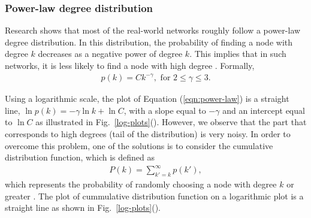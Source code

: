 \documentclass[10pt,a4paper]{article}
\theoremstyle{plain}
\theoremstyle{definition}
\begin{document}
\subsubsection{Power-law degree distribution}
Research shows that most of the real-world networks roughly follow a power-law degree distribution. In this distribution, the probability of finding a node with degree $k$ decreases as a negative power of degree $k$. This implies that in such networks, it is less likely to find a node with high degree \citep{estrada2011structure}.
Formally,
\begin{eqnarray}
p(k) = C k^{-\gamma}, \text{ for } 2 \leq  \gamma \leq  3.
\label{eqn:power-law}
\end{eqnarray}

Using a logarithmic scale, the plot of Equation (\ref{eqn:power-law}) is a straight line, $\ln p(k) = -\gamma \ln k + \ln C $, with a slope equal to $-\gamma $ and an intercept equal to $\ln C$ as illustrated in Fig.~\ref{log-plots}(). However, we observe that the part that corresponds to high degrees (tail of the distribution) is very noisy. In order to overcome this problem, one of the solutions is to consider the cumulative distribution function, which is defined as 
\begin{eqnarray*}
	P(k) = \sum_{k'=k}^\infty p(k'),
\end{eqnarray*}
which represents the probability of randomly choosing a node with degree $k$ or greater \citep{estrada2011structure}. The plot of cummulative distribution function on a logarithmic plot is a straight line as shown in Fig.~\ref{log-plots}().
\end{document}
